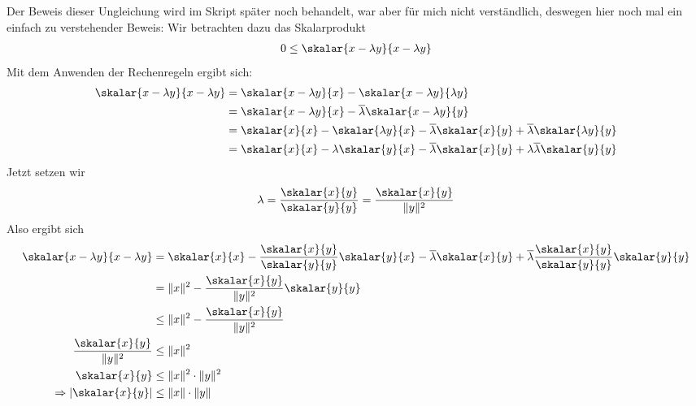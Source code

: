 \begin{*anmerkung}
	Der Beweis dieser Ungleichung wird im Skript später noch behandelt, war aber für mich nicht verständlich, deswegen hier noch mal ein einfach zu verstehender Beweis: Wir betrachten dazu das Skalarprodukt
	\begin{align}
	0\le \skalar{x-\lambda y}{x-\lambda y}\notag
	\end{align}
	Mit dem Anwenden der Rechenregeln ergibt sich:
	\begin{align}
	\skalar{x-\lambda y}{x-\lambda y} &= \skalar{x-\lambda y}{x}-\skalar{x-\lambda y}{\lambda y}\notag \\
	&= \skalar{x-\lambda y}{x}-\overline{\lambda}\skalar{x-\lambda y}{y} \notag \\
	&= \skalar{x}{x}-\skalar{\lambda y}{x}-\overline{\lambda}\skalar{x}{y}+\overline{\lambda}\skalar{\lambda y}{y} \notag \\
	&= \skalar{x}{x}-\lambda\skalar{y}{x}-\overline{\lambda}\skalar{x}{y}+\lambda\overline{\lambda}\skalar{y} {y}\notag
	\end{align}
	Jetzt setzen wir
	\begin{align}
	\lambda = \frac{\skalar{x}{y}}{\skalar{y}{y}}=\frac{\skalar{x}{y}}{\Vert y\Vert^2}\notag
	\end{align}
	Also ergibt sich
	\begin{align}
	\skalar{x-\lambda y}{x-\lambda y} &= \skalar{x}{x}-\frac{\skalar{x}{y}}{\skalar{y}{y}}\skalar{y}{x}-\overline{\lambda}\skalar{x}{y}+\overline{\lambda}\frac{\skalar{x}{y}}{\skalar{y}{y}}\skalar{y}{y} \notag \\
	&= \Vert x\Vert^2 - \frac{\skalar{x}{y}}{\Vert y\Vert^2}\skalar{y}{y} \notag \\
	&\le \Vert x\Vert^2-\frac{\skalar{x}{y}}{\Vert y\Vert^2} \notag \\
	\frac{\skalar{x}{y}}{\Vert y\Vert^2} &\le \Vert x\Vert^2 \notag \\
	\skalar{x}{y} &\le \Vert x\Vert^2\cdot \Vert y\Vert^2 \notag \\
	\Rightarrow\vert\skalar{x}{y}\vert &\le \Vert x\Vert\cdot \Vert y\Vert\notag
	\end{align}
\end{*anmerkung}

